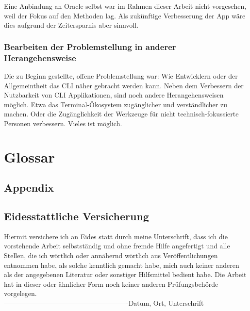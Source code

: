\documentclass[oneside,bibliography=totocnumbered,BCOR=5mm]{scrbook}
\begin{document}
Eine Anbindung an Oracle selbst war im Rahmen dieser Arbeit nicht vorgesehen,
weil der Fokus auf den Methoden lag. Als zukünftige Verbesserung der App wäre
dies aufgrund der Zeitersparnis aber sinnvoll.

\subsection{Bearbeiten der Problemstellung in anderer Herangehensweise}

Die zu Beginn gestellte, offene Problemstellung war: Wie Entwicklern oder der
Allgemeintheit das CLI näher gebracht werden kann. Neben dem Verbessern der
Nutzbarkeit von CLI Applikationen, sind noch andere Herangehensweisen möglich.
Etwa das Terminal-Ökosystem zugänglicher und verständlicher zu machen. Oder
die Zugänglichkeit der Werkzeuge für nicht technisch-fokussierte Personen
verbessern. Vieles ist möglich.

\printbibliography[
heading=bibintoc,
title={Quellenverzeichnis}
]

\newpage
\chapter{Glossar}

\begin{appendix}
\chapter{Appendix}


\newpage
\thispagestyle{empty}
\noindent

\section*{Eidesstattliche Versicherung}
Hiermit versichere ich an Eides statt durch meine Unterschrift, dass ich die vorstehende Arbeit selbstst\"andig und ohne fremde Hilfe angefertigt und alle Stellen, die ich w\"ortlich oder ann\"ahernd w\"ortlich aus Ver\"offentlichungen entnommen habe, als solche kenntlich gemacht habe, mich auch keiner anderen als der angegebenen Literatur oder sonstiger Hilfsmittel bedient habe. Die Arbeit hat in dieser oder \"ahnlicher Form noch keiner anderen Pr\"ufungsbeh\"orde vorgelegen.\\
\linebreak[4]
\linebreak[4]
\linebreak[4]
\linebreak[4]
-------------------------------------------------------\linebreak[4]
Datum, Ort, Unterschrift

\end{appendix}
\end{document}
